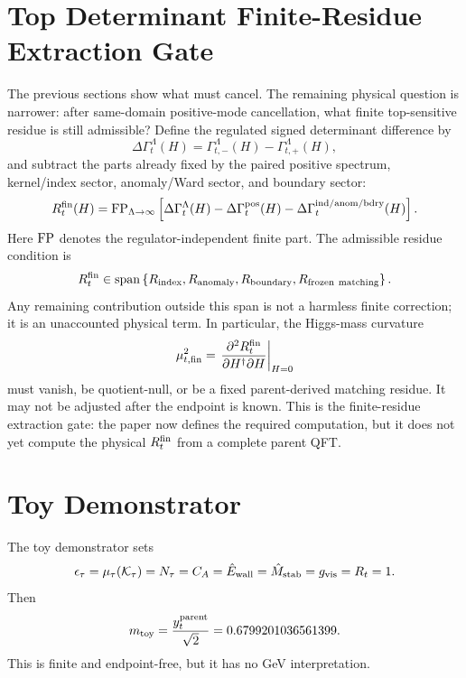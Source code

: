 \documentclass[11pt]{article}
\begin{document}
\section{Top Determinant Finite-Residue Extraction Gate}
The previous sections show what must cancel.  The remaining physical question
is narrower: after same-domain positive-mode cancellation, what finite
top-sensitive residue is still admissible?  Define the regulated signed
determinant difference by
\begin{equation}
\Delta\Gamma_t^\Lambda(H)
=
\Gamma_{t,-}^\Lambda(H)-\Gamma_{t,+}^\Lambda(H),
\end{equation}
and subtract the parts already fixed by the paired positive spectrum,
kernel/index sector, anomaly/Ward sector, and boundary sector:
\begin{equation}
R_t^{\rm fin}(H)
=
{\rm FP}_{\Lambda\to\infty}
\left[
\Delta\Gamma_t^\Lambda(H)
-\Delta\Gamma_t^{\rm pos}(H)
-\Delta\Gamma_t^{\rm ind/anom/bdry}(H)
\right].
\end{equation}
Here ${\rm FP}$ denotes the regulator-independent finite part.  The admissible
residue condition is
\begin{equation}
R_t^{\rm fin}
\in
\operatorname{span}\left\lbrace
R_{\rm index},
R_{\rm anomaly},
R_{\rm boundary},
R_{\rm frozen\ matching}
\right\rbrace .
\end{equation}
Any remaining contribution outside this span is not a harmless finite
correction; it is an unaccounted physical term.  In particular, the Higgs-mass
curvature
\begin{equation}
\mu_{t,{\rm fin}}^2
=
\left.
\frac{\partial^2 R_t^{\rm fin}}{\partial H^\dagger\partial H}
\right|_{H=0}
\end{equation}
must vanish, be quotient-null, or be a fixed parent-derived matching residue.
It may not be adjusted after the endpoint is known.  This is the finite-residue
extraction gate: the paper now defines the required computation, but it does
not yet compute the physical $R_t^{\rm fin}$ from a complete parent QFT.

\section{Toy Demonstrator}
The toy demonstrator sets
\begin{equation}
\epsilon_\tau=\mu_\tau({\cal K}_\tau)=N_\tau=C_A=\hat E_{\rm wall}
=\hat M_{\rm stab}=g_{\rm vis}=R_t=1.
\end{equation}
Then
\begin{equation}
m_{\rm toy}=\frac{y_t^{\rm parent}}{\sqrt2}
=0.6799201036561399.
\end{equation}
This is finite and endpoint-free, but it has no GeV interpretation.
\end{document}
